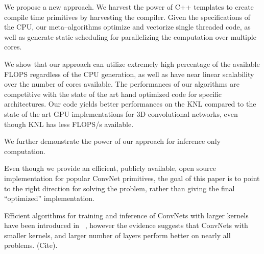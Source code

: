   We propose a new approach.  We harvest the power of C++ templates to
  create compile time primitives by harvesting the compiler.  Given
  the specifications of the CPU, our meta--algorithms optimize and
  vectorize single threaded code, as well as generate static
  scheduling for parallelizing the computation over multiple cores.

  We show that our approach can utilize extremely high percentage of
  the available FLOPS regardless of the CPU generation, as well as
  have near linear scalability over the number of cores available.
  The performances of our algorithms are competitive with the state of
  the art hand optimized code for specific architectures.  Our code
  yields better performances on the KNL compared to the state of the
  art GPU implementations for 3D convolutional networks, even though
  KNL has less FLOPS/s available.

  We further demonstrate the power of our approach for inference only
  computation.

  Even though we provide an efficient, publicly available, open source
  implementation for popular ConvNet primitives, the goal of this
  paper is to point to the right direction for solving the problem,
  rather than giving the final ``optimized'' implementation.

  Efficient algorithms for training and inference of ConvNets with
  larger kernels have been introduced in
  ~\cite{zlateski2016znn,zlateski2016znni}, however the evidence
  suggests that ConvNets with smaller kernels, and larger number of
  layers perform better on nearly all problems. (Cite).







